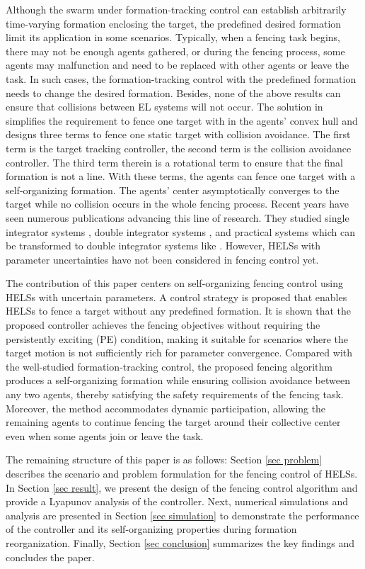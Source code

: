 Although the swarm under formation-tracking control can establish arbitrarily time-varying formation enclosing the target,
the predefined desired formation limit its application in some scenarios.
Typically, when a fencing task begins, there may not be enough agents gathered, or during the fencing process, some agents may malfunction and need to be replaced with other agents or leave the task. 
In such cases, the formation-tracking control with the predefined formation needs to change the desired formation.
Besides, none of the above results can ensure that collisions between EL systems will not occur.
The solution in \cite{chenCooperativeTargetfencingProtocol2019} simplifies the requirement to fence one target with in the agents' convex hull and designs three terms to fence one static target with collision avoidance.
The first term is the target tracking controller, the second term is the collision avoidance controller.
The third term therein is a rotational term to ensure that the final formation is not a line.
With these terms, the agents can fence one target with a self-organizing formation.
The agents' center asymptotically converges to the target while no collision occurs in the whole fencing process.
Recent years have seen numerous publications advancing this line of research.
They studied single integrator systems \cite{kouCooperativeFencingControl2022}, double integrator systems \cite{kouCooperativeFencingControl2021,huCooperativeLabelfreeMoving2023,panCooperativeTargetFencing2024a},
and practical systems which can be transformed to double integrator systems like \cite{wenDistributedCooperativeFencing2023}.
However, HELSs with parameter uncertainties have not been considered in fencing control yet.

The contribution of this paper centers on self-organizing fencing control using HELSs with uncertain parameters.
A control strategy is proposed that enables HELSs to fence a target without any predefined formation.
It is shown that the proposed controller achieves the fencing objectives without requiring the persistently exciting (PE) condition, making it suitable for scenarios where the target motion is not sufficiently rich for parameter convergence.
Compared with the well-studied formation-tracking control, the proposed fencing algorithm produces a self-organizing formation while ensuring collision avoidance between any two agents, thereby satisfying the safety requirements of the fencing task.
Moreover, the method accommodates dynamic participation, allowing the remaining agents to continue fencing the target around their collective center even when some agents join or leave the task.

The remaining structure of this paper is as follows: 
Section \ref{sec problem} describes the scenario and problem formulation for the fencing control of HELSs. 
In Section \ref{sec result}, we present the design of the fencing control algorithm and provide a Lyapunov analysis of the controller.
Next, numerical simulations and analysis are presented in Section \ref{sec simulation} to demonstrate the performance of the controller and its self-organizing properties during formation reorganization. 
Finally, Section \ref{sec conclusion} summarizes the key findings and concludes the paper.


